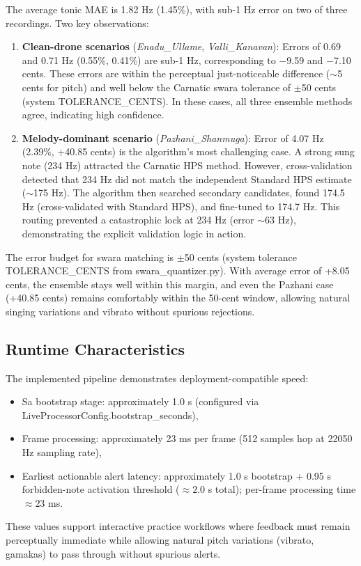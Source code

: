 \documentclass{ieeeaccess}
\begin{document}
The average tonic MAE is 1.82 Hz (1.45\%), with sub-1 Hz error on two of three recordings. Two key observations:
\begin{enumerate}
\item \textbf{Clean-drone scenarios} (\textit{Enadu\_Ullame}, \textit{Valli\_Kanavan}): Errors of 0.69 and 0.71 Hz (0.55\%, 0.41\%) are sub-1 Hz, corresponding to $-$9.59 and $-$7.10 cents. These errors are within the perceptual just-noticeable difference ($\sim$5 cents for pitch) and well below the Carnatic swara tolerance of $\pm$50 cents (system TOLERANCE_CENTS). In these cases, all three ensemble methods agree, indicating high confidence.
\item \textbf{Melody-dominant scenario} (\textit{Pazhani\_Shanmuga}): Error of 4.07 Hz (2.39\%, +40.85 cents) is the algorithm's most challenging case. A strong sung note (234 Hz) attracted the Carnatic HPS method. However, cross-validation detected that 234 Hz did not match the independent Standard HPS estimate ($\sim$175 Hz). The algorithm then searched secondary candidates, found 174.5 Hz (cross-validated with Standard HPS), and fine-tuned to 174.7 Hz. This routing prevented a catastrophic lock at 234 Hz (error $\sim$63 Hz), demonstrating the explicit validation logic in action.
\end{enumerate}
The error budget for swara matching is $\pm$50 cents (system tolerance TOLERANCE_CENTS from swara_quantizer.py). With average error of +8.05 cents, the ensemble stays well within this margin, and even the Pazhani case (+40.85 cents) remains comfortably within the 50-cent window, allowing natural singing variations and vibrato without spurious rejections.

\subsection{Runtime Characteristics}
The implemented pipeline demonstrates deployment-compatible speed:
\begin{itemize}
\item Sa bootstrap stage: approximately 1.0 s (configured via LiveProcessorConfig.bootstrap_seconds),
\item Frame processing: approximately 23 ms per frame (512 samples hop at 22050 Hz sampling rate),
\item Earliest actionable alert latency: approximately 1.0 s bootstrap + 0.95 s forbidden-note activation threshold ($\approx 2.0$ s total); per-frame processing time $\approx 23$ ms.
\end{itemize}
These values support interactive practice workflows where feedback must remain perceptually immediate while allowing natural pitch variations (vibrato, gamakas) to pass through without spurious alerts.
\end{document}
